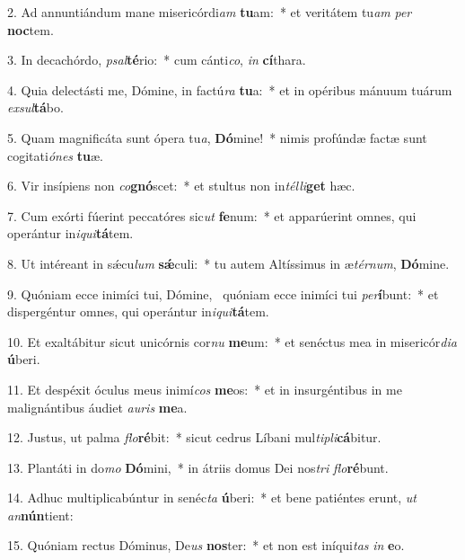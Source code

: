 2. Ad annuntiándum mane misericórdi\textit{am} \textbf{tu}am:~*  et veritátem tu\textit{am} \textit{per} \textbf{noc}tem.\

3. In decachórdo, \textit{psal}\textbf{té}rio:~*  cum cánti\textit{co}, \textit{in} \textbf{cí}thara.\

4. Quia delectásti me, Dómine, in factú\textit{ra} \textbf{tu}a:~*  et in opéribus mánuum tuárum \textit{ex}\textit{sul}\textbf{tá}bo.\

5. Quam magnificáta sunt ópera tu\textit{a}, \textbf{Dó}mine!~*  nimis profúndæ factæ sunt cogitati\textit{ó}\textit{nes} \textbf{tu}æ.\

6. Vir insípiens non \textit{co}\textbf{gnó}scet:~*  et stultus non in\textit{tél}\textit{li}\textbf{get} hæc.\

7. Cum exórti fúerint peccatóres sic\textit{ut} \textbf{fe}num:~*  et apparúerint omnes, qui operántur in\textit{i}\textit{qui}\textbf{tá}tem.\

8. Ut intéreant in sǽcu\textit{lum} \textbf{sǽ}culi:~*  tu autem Altíssimus in æ\textit{tér}\textit{num}, \textbf{Dó}mine.\

9. Quóniam ecce inimíci tui, Dómine, \dag\  quóniam ecce inimíci tui \textit{per}\textbf{í}bunt:~*  et dispergéntur omnes, qui operántur in\textit{i}\textit{qui}\textbf{tá}tem.\

10. Et exaltábitur sicut unicórnis cor\textit{nu} \textbf{me}um:~*  et senéctus mea in misericór\textit{di}\textit{a} \textbf{ú}beri.\

11. Et despéxit óculus meus inimí\textit{cos} \textbf{me}os:~*  et in insurgéntibus in me malignántibus áudiet \textit{au}\textit{ris} \textbf{me}a.\

12. Justus, ut palma \textit{flo}\textbf{ré}bit:~*  sicut cedrus Líbani mul\textit{ti}\textit{pli}\textbf{cá}bitur.\

13. Plantáti in do\textit{mo} \textbf{Dó}mini,~*  in átriis domus Dei nos\textit{tri} \textit{flo}\textbf{ré}bunt.\

14. Adhuc multiplicabúntur in senéc\textit{ta} \textbf{ú}beri:~*  et bene patiéntes erunt, \textit{ut} \textit{an}\textbf{nún}tient:\

15. Quóniam rectus Dóminus, De\textit{us} \textbf{nos}ter:~*  et non est iníqui\textit{tas} \textit{in} \textbf{e}o.\


